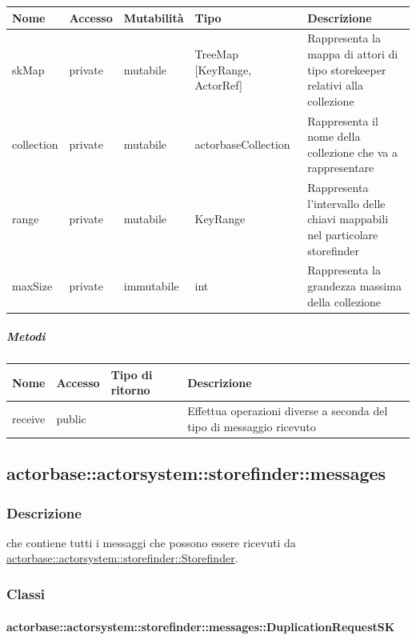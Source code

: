 \documentclass{scalatekids-article}
\begin{document}
\begin{tabular}{| p{3cm} | p{1.5cm} | p{2cm} | p{2cm} | p{8.5cm} |}
  \hline
  Nome & Accesso & Mutabilità & Tipo & Descrizione\\
  \hline
  skMap & private & mutabile & TreeMap [KeyRange, ActorRef] & Rappresenta la mappa di attori di tipo storekeeper relativi alla collezione \\
  \hline
  collection & private & mutabile & actorbaseCollection & Rappresenta il nome della collezione che va a rappresentare\\
  \hline
  range & private & mutabile & KeyRange & Rappresenta l'intervallo delle chiavi mappabili nel particolare storefinder\\
  \hline
  maxSize & private & immutabile & int & Rappresenta la grandezza massima della collezione\\
  \hline
\end{tabular}

\subparagraph{Metodi}

\begin{tabular}{| l | l | l | l |}
  \hline
  Nome & Accesso & Tipo di ritorno & Descrizione\\
  \hline
  receive & public &  & Effettua operazioni diverse a seconda del tipo di messaggio ricevuto\\
  \hline
\end{tabular}

\subsection{actorbase::actorsystem::storefinder::messages}
\label{sec:actorbase::actorsystem::storefinder::messages}

\subsubsection{Descrizione}

 che contiene tutti i messaggi che possono essere ricevuti da
\hyperref[sec:actorbase::actorsystem::storefinder::Storefinder]{actorbase::actorsystem::storefinder::Storefinder}.

\subsubsection{Classi}

\paragraph{actorbase::actorsystem::storefinder::messages::DuplicationRequestSK}
\label{sec:actorbase::actorsystem::storefinder::messages::DuplicationRequestSK}
\end{document}
